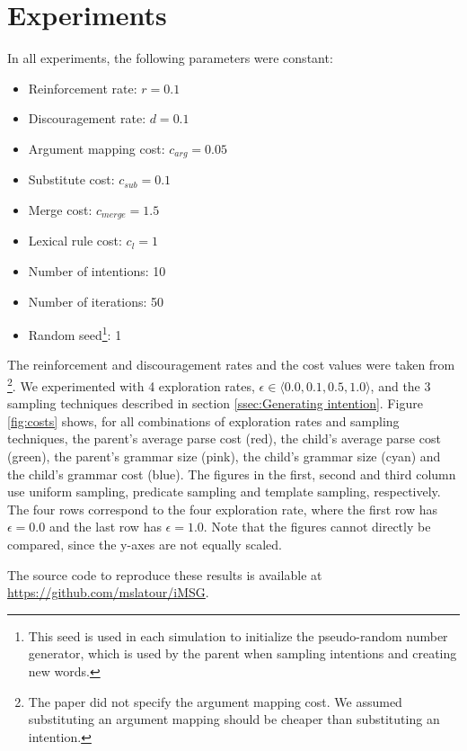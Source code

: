 \documentclass[a4paper]{article}
\begin{document}
\section{Experiments}
\label{sec:experiments}
In all experiments, the following parameters were constant:
\begin{itemize}
\item Reinforcement rate: $r = 0.1$
\item Discouragement rate: $d = 0.1$
\item Argument mapping cost: $c_{arg} = 0.05$
\item Substitute cost: $c_{sub} = 0.1$
\item Merge cost: $c_{merge} = 1.5$
\item Lexical rule cost: $c_l = 1$
\item Number of intentions: 10
\item Number of iterations: 50
\item Random seed\footnote{This seed is used in each simulation to initialize the pseudo-random number generator, which is used by the parent when sampling intentions and creating new words.}: 1
\end{itemize}
The reinforcement and discouragement rates and the cost values were taken from \cite{batali1999negotiation}\footnote{The paper did not specify the argument mapping cost. We assumed substituting an argument mapping should be cheaper than substituting an intention.}. We experimented with 4 exploration rates, $\epsilon \in \langle 0.0, 0.1, 0.5, 1.0 \rangle$, and the 3 sampling techniques described in section \ref{ssec:Generating intention}. Figure \ref{fig:costs} shows, for all combinations of exploration rates and sampling techniques, the parent's average parse cost (red), the child's average parse cost (green), the parent's grammar size (pink), the child's grammar size (cyan) and the child's grammar cost (blue). The figures in the first, second and third column use uniform sampling, predicate sampling and template sampling, respectively. The four rows correspond to the four exploration rate, where the first row has $\epsilon = 0.0$ and the last row has $\epsilon = 1.0$. Note that the figures cannot directly be compared, since the y-axes are not equally scaled. 


The source code to reproduce these results is available at \url{https://github.com/mslatour/iMSG}.
\end{document}
